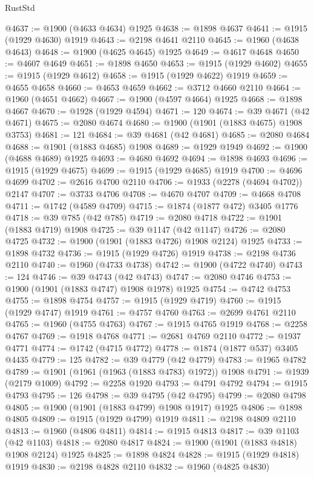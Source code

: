 \begin{lexlean}{RustStd}
\begin{coremodule}
@4637 := @1900 (@4633 @4634) @1925
@4638 := @1898 @4637
@4641 := @1915 (@1929 @4630) @1919
@4643 := @2198 @4641 @2110
@4645 := @1960 (@4638 @4643)
@4648 := @1900 (@4625 @4645) @1925
@4649 := @4617 @4648
@4650 := @4607 @4649
@4651 := @1898 @4650
@4653 := @1915 (@1929 @4602)
@4655 := @1915 (@1929 @4612)
@4658 := @1915 (@1929 @4622) @1919
@4659 := @4655 @4658
@4660 := @4653 @4659
@4662 := @3712 @4660 @2110
@4664 := @1960 (@4651 @4662)
@4667 := @1900 (@4597 @4664) @1925
@4668 := @1898 @4667
@4670 := @1928 (@1929 @4594)
@4671 := 120
@4674 := @39 @4671 (@42 @4671)
@4675 := @2080 @4674
@4680 := @1900 (@1901 (@1883 @4675) @1908 @3753)
@4681 := 121
@4684 := @39 @4681 (@42 @4681)
@4685 := @2080 @4684
@4688 := @1901 (@1883 @4685) @1908
@4689 := @1929 @1949
@4692 := @1900 (@4688 @4689) @1925
@4693 := @4680 @4692
@4694 := @1898 @4693
@4696 := @1915 (@1929 @4675)
@4699 := @1915 (@1929 @4685) @1919
@4700 := @4696 @4699
@4702 := @2616 @4700 @2110
@4706 := @1933 (@2278 (@4694 @4702)) @2147
@4707 := @3733 @4706
@4708 := @4670 @4707
@4709 := @4668 @4708
@4711 := @1742 (@4589 @4709)
@4715 := @1874 (@1877 @472) @3405 @1776
@4718 := @39 @785 (@42 @785)
@4719 := @2080 @4718
@4722 := @1901 (@1883 @4719) @1908
@4725 := @39 @1147 (@42 @1147)
@4726 := @2080 @4725
@4732 := @1900 (@1901 (@1883 @4726) @1908 @2124) @1925
@4733 := @1898 @4732
@4736 := @1915 (@1929 @4726) @1919
@4738 := @2198 @4736 @2110
@4740 := @1960 (@4733 @4738)
@4742 := @1900 (@4722 @4740)
@4743 := 124
@4746 := @39 @4743 (@42 @4743)
@4747 := @2080 @4746
@4753 := @1900 (@1901 (@1883 @4747) @1908 @1978) @1925
@4754 := @4742 @4753
@4755 := @1898 @4754
@4757 := @1915 (@1929 @4719)
@4760 := @1915 (@1929 @4747) @1919
@4761 := @4757 @4760
@4763 := @2699 @4761 @2110
@4765 := @1960 (@4755 @4763)
@4767 := @1915 @4765 @1919
@4768 := @2258 @4767
@4769 := @1918 @4768
@4771 := @2681 @4769 @2110
@4772 := @1937 @4771
@4774 := @1742 (@4715 @4772)
@4778 := @1874 (@1877 @537) @3405 @4435
@4779 := 125
@4782 := @39 @4779 (@42 @4779)
@4783 := @1965 @4782
@4789 := @1901 (@1961 (@1963 (@1883 @4783) @1972)) @1908
@4791 := @1939 (@2179 @1009)
@4792 := @2258 @1920
@4793 := @4791 @4792
@4794 := @1915 @4793
@4795 := 126
@4798 := @39 @4795 (@42 @4795)
@4799 := @2080 @4798
@4805 := @1900 (@1901 (@1883 @4799) @1908 @1917) @1925
@4806 := @1898 @4805
@4809 := @1915 (@1929 @4799) @1919
@4811 := @2198 @4809 @2110
@4813 := @1960 (@4806 @4811)
@4814 := @1915 @4813
@4817 := @39 @1103 (@42 @1103)
@4818 := @2080 @4817
@4824 := @1900 (@1901 (@1883 @4818) @1908 @2124) @1925
@4825 := @1898 @4824
@4828 := @1915 (@1929 @4818) @1919
@4830 := @2198 @4828 @2110
@4832 := @1960 (@4825 @4830)

\end{coremodule}
\end{lexlean}
